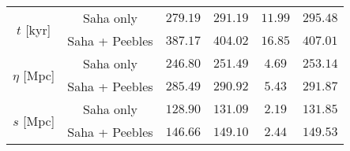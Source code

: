 \documentclass{aa}
\begin{document}
\begin{table*}
\begin{tabular}{| c || c || c | c | c | c |}
  \hline 
  \multirow{2}{*}{$t$ [kyr]} & Saha only       & \hspace{1pt}$279.19$   & \hspace{1pt}$291.19$      & \hspace{-0.5pt}$11.99$        & \hspace{1pt}$295.48$    \\
  \cline{2-6}
                           & Saha + Peebles  & \hspace{1pt}$387.17$   & \hspace{1pt}$404.02$      & \hspace{-0.5pt}$16.85$      & \hspace{1pt}$407.01$    \\
  \hline 
  \multirow{2}{*}{$\eta$ [Mpc]} & Saha only       & \hspace{1pt}$246.80$   & \hspace{1pt}$251.49$      & \hspace{4.5pt}$4.69$        & \hspace{1pt}$253.14$    \\ 
  \cline{2-6}
                           & Saha + Peebles  & \hspace{1pt}$285.49$   & \hspace{1pt}$290.92$      & \hspace{4.5pt}$5.43$        & \hspace{1pt}$291.87$    \\ 
  \hline 
  \multirow{2}{*}{$s$ [Mpc]} & Saha only       & \hspace{1pt}$128.90$   & \hspace{1pt}$131.09$      & \hspace{4.5pt}$2.19$        & \hspace{1pt}$131.85$    \\ 
  \cline{2-6}
                           & Saha + Peebles  & \hspace{1pt}$146.66$   & \hspace{1pt}$149.10$      & \hspace{4.5pt}$2.44$        & \hspace{1pt}$149.53$    \\
  \hline                                   %
  \end{tabular}
\end{table*}
\end{document}
